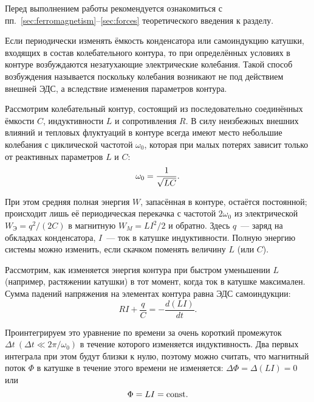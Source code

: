 


Перед выполнением работы рекомендуется ознакомиться с
пп.~\ref{sec:ferromagnetism}--\ref{sec:forces} теоретического
введения к разделу.

Если периодически изменять ёмкость конденсатора или самоиндукцию катушки,
входящих в состав колебательного контура, то при определённых условиях в контуре
возбуждаются незатухающие электрические колебания. Такой способ возбуждения
называется  поскольку колебания возникают не под
действием внешней ЭДС, а вследствие изменения параметров контура.

Рассмотрим колебательный контур, состоящий из последовательно соединённых
ёмкости $C$, индуктивности $L$ и сопротивления $R$. В силу неизбежных внешних
влияний и тепловых флуктуаций в контуре всегда имеют место небольшие колебания с
циклической частотой $\omega_0$, которая при малых потерях зависит только от реактивных
параметров $L$ и $C$:
\begin{equation}
	\eqmark{4.6.1}
	 \omega_0 = \frac{1}{\sqrt{LC}}.
\end{equation}

При этом средняя полная энергия $W$, запасённая в контуре, остаётся постоянной;
происходит лишь её периодическая перекачка с частотой $2\omega_0$ из
электрической $W_\text{Э} = q^2 / (2C)$ в магнитную $W_M = LI^2/2$ и обратно.
Здесь $q$~--- заряд на обкладках конденсатора, $I$~--- ток в катушке
индуктивности. Полную энергию системы можно изменить, если скачком поменять
величину $L$ (или $C$).

 Рассмотрим, как изменяется энергия контура при быстром уменьшении $L$
(например, растяжении катушки) в тот момент, когда ток в катушке максимален.
Сумма падений напряжения на элементах контура равна ЭДС самоиндукции:
\begin{equation*}
	RI + \frac{q}{C}= - \frac{d(LI)}{dt}.
\end{equation*}

Проинтегрируем это уравнение по времени за очень короткий промежуток $\Delta t
~(\Delta t \ll 2\pi/\omega_0)$ в течение которого изменяется индуктивность. Два
первых интеграла при этом будут близки к нулю, поэтому можно считать, что
магнитный поток $\Phi$ в катушке в течение этого времени не изменяется:
$\Delta \Phi=\Delta (LI) = 0$ или
\begin{equation}
	\eqmark{4.6.2}
	\Phi=LI =\const.
\end{equation}

